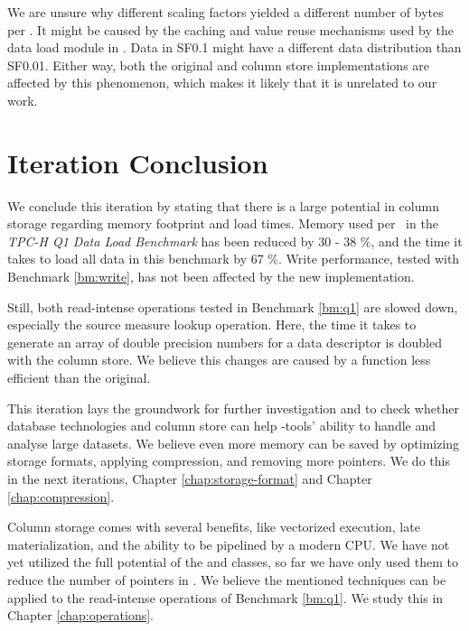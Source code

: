 We are unsure why different scaling factors yielded a different number of bytes per \lineitem. It might be caused by the caching and value reuse mechanisms used by the data load module in \gap. Data in SF0.1 might have a different data distribution than SF0.01. Either way, both the original and column store implementations are affected by this phenomenon, which makes it likely that it is unrelated to our work.

\section{Iteration Conclusion}
\label{sec:Iteration Conclusion}
We conclude this iteration by stating that there is a large potential in column storage regarding memory footprint and load times. Memory used per \lineitem~in the \textit{TPC-H Q1 Data Load Benchmark} has been reduced by 30 - 38 \%, and the time it takes to load all data in this benchmark by 67 \%. Write performance, tested with Benchmark \ref{bm:write}, has not been affected by the new implementation.

Still, both read-intense operations tested in Benchmark \ref{bm:q1} are slowed down, especially the source measure lookup operation. Here, the time it takes to generate an array of double precision numbers for a data descriptor is doubled with the column store. We believe this changes are caused by a  function less efficient than the original.

This iteration lays the groundwork for further investigation and to check whether database technologies and column store can help \mdd-tools' ability to handle and analyse large datasets. We believe even more memory can be saved by optimizing storage formats, applying compression, and removing more pointers. We do this in the next iterations, Chapter \ref{chap:storage-format} and Chapter \ref{chap:compression}. 

Column storage comes with several benefits, like vectorized execution, late materialization, and the ability to be pipelined by a modern CPU. We have not yet utilized the full potential of the  and  classes, so far we have only used them to reduce the number of pointers in \gap. We believe the mentioned techniques can be applied to the read-intense operations of Benchmark \ref{bm:q1}. We study this in Chapter \ref{chap:operations}.

